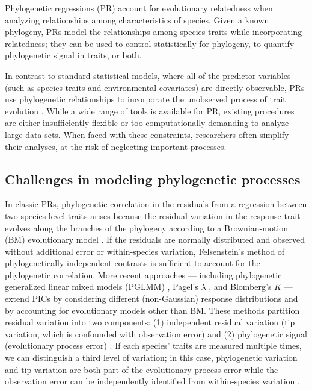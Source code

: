 \documentclass[12pt]{article}
\begin{document}
Phylogenetic regressions (PR) account for evolutionary relatedness when analyzing relationships among characteristics of species.
Given a known phylogeny, PRs model the relationships among species traits while incorporating relatedness; they can be used to control statistically for phylogeny, to quantify phylogenetic signal in traits, or both. 

In contrast to standard statistical models, where all of the predictor variables (such as species traits and environmental covariates) are directly observable, PRs use phylogenetic relationships to incorporate the unobserved process of trait evolution \citep{felsenstein1985phylogenies, butler2004phylogenetic, hansen2012interpreting}. 
While a wide range of tools is available for PR, existing procedures are either insufficiently flexible or too computationally demanding to analyze large data sets.
When faced with these constraints, researchers often simplify their analyses, at the risk of neglecting important processes.

\subsection*{Challenges in modeling phylogenetic processes}

In classic PRs, phylogenetic correlation in the residuals from a regression between two species-level traits arises because the residual variation in the response trait evolves along the branches of the phylogeny according to a Brownian-motion (BM) evolutionary model \citep{felsenstein1985phylogenies}. 
If the residuals are normally distributed and observed without additional error or within-species variation, Felsenstein's method of phylogenetically independent contrasts  \citep[PICS:][]{felsenstein1985phylogenies} is sufficient to account for the phylogenetic correlation.
More recent approaches --- including phylogenetic generalized linear mixed models (PGLMM) \citep{ives2011generalized, housworth2004phylogenetic}, Pagel's $\lambda$ \citep{pagel1999inferring}, and Blomberg's $K$ \citep{blomberg2003testing} --- extend PICs by considering different (non-Gaussian) response distributions and by accounting for evolutionary models other than BM.
These methods partition residual variation into two components: (1) independent residual variation (tip variation, which is confounded with observation error) and (2) phylogenetic signal (evolutionary process error) \citep{hansen2012interpreting, housworth2004phylogenetic}.
If each species' traits are measured multiple times, we can distinguish a third level of variation; in this case, phylogenetic variation and tip variation are both part of the evolutionary process error while the observation error can be independently identified from within-species variation \citep{kostikova2016bridging, devillemereuil2012bayesian}.
\end{document}

